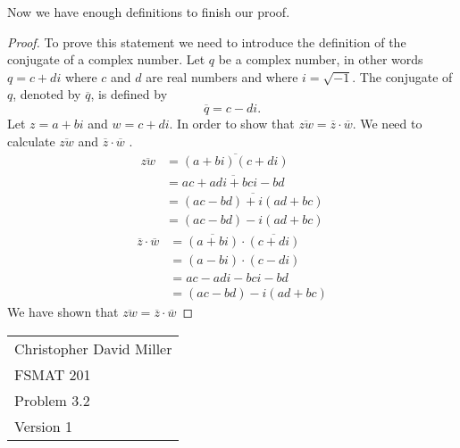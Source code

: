 \documentclass[12pt]{article}
\begin{document}
Now we have enough definitions to finish our proof.
\begin{proof}
  To prove this statement we need to introduce the definition of the conjugate of a complex number. Let $q$ be a complex number, in other words $q = c + di$ where $c$ and $d$ are real numbers and where $i = \sqrt{-1}.$ The conjugate of $q$, denoted by $\overline{q}$, is defined by $$\overline{q}= c - di.$$
  Let $z = a + bi$ and $w = c + di $. In order to show that  $\overline{zw} = \overline{z} \cdot \overline{w}$. We need to calculate $\overline{zw}$ and $\overline{z} \cdot \overline{w}$ .
  $$
  \begin{aligned}
    \overline{zw} &= \overline{(a+bi)(c+di)} \\ 
     &= \overline{ac+adi+bci-bd}\\
     &= \overline{(ac-bd)+i(ad+bc)}\\
     &= (ac-bd)-i(ad+bc)  
  \end{aligned}
  $$
  \begin{equation*}
    \begin{aligned}
      \overline{z} \cdot \overline{w} &= \overline{(a+bi)} \cdot \overline{(c+di)} \\ 
       &= (a-bi) \cdot (c-di)\\
       &= ac -adi-bci-bd\\
       &= (ac-bd)-i(ad+bc)  
    \end{aligned}
  \end{equation*}
  We have shown that $\overline{zw} = \overline{z} \cdot \overline{w}$
    
      
      

    
\end{proof}
\newpage
\begin{flushright}
  \begin{tabular}{l}
  Christopher David Miller \\  %
  FSMAT 201 \\  %
  Problem 3.2 \\  %
  Version 1 \\ %
  \end{tabular}
  \end{flushright}
  \vspace{20pt}  %
  
\end{document}

